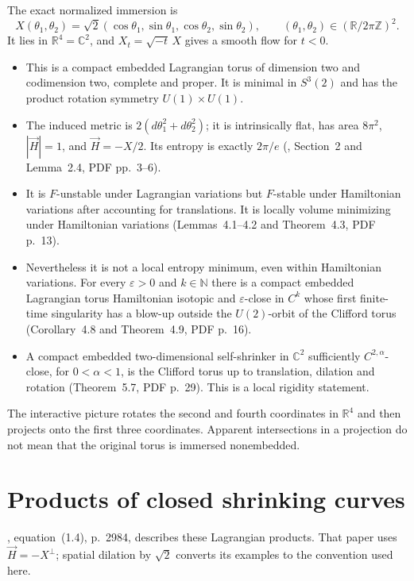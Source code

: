 \begin{example}\label{ex:catalogue-clifford-torus}
The exact normalized immersion is
\[
 X(\theta_1,\theta_2)=\sqrt2
 (\cos\theta_1,\sin\theta_1,\cos\theta_2,\sin\theta_2),
 \qquad (\theta_1,\theta_2)\in(\mathbb R/2\pi\mathbb Z)^2.
\]
It lies in $\mathbb R^4=\mathbb C^2$, and
$X_t=\sqrt{-t}\,X$ gives a smooth flow for $t<0$.
\begin{itemize}
\item This is a compact embedded Lagrangian torus of dimension two and
codimension two, complete and proper. It is minimal in $S^3(2)$ and has
the product rotation symmetry $U(1)\times U(1)$.
\item The induced metric is $2(d\theta_1^2+d\theta_2^2)$; it is
intrinsically flat, has area $8\pi^2$, $|\vec H|=1$, and
$\vec H=-X/2$. Its entropy is exactly $2\pi/e$
(\cite{CatELS2020}, Section~2 and Lemma~2.4, PDF pp.~3--6).
\item It is $F$-unstable under Lagrangian variations but $F$-stable under
Hamiltonian variations after accounting for translations. It is locally
volume minimizing under Hamiltonian variations (Lemmas~4.1--4.2 and
Theorem~4.3, PDF p.~13).
\item Nevertheless it is not a local entropy minimum, even within
Hamiltonian variations. For every $\varepsilon>0$ and $k\in\mathbb N$
there is a compact embedded Lagrangian torus Hamiltonian isotopic and
$\varepsilon$-close in $C^k$ whose first finite-time singularity has a
blow-up outside the $U(2)$-orbit of the Clifford torus
(Corollary~4.8 and Theorem~4.9, PDF p.~16).
\item A compact embedded two-dimensional self-shrinker in $\mathbb C^2$
sufficiently $C^{2,\alpha}$-close, for $0<\alpha<1$, is the Clifford
torus up to translation, dilation and rotation (Theorem~5.7, PDF p.~29).
This is a local rigidity statement.
\end{itemize}
The interactive picture rotates the second and fourth coordinates in
$\mathbb R^4$ and then projects onto the first three coordinates. Apparent intersections in a
projection do not mean that the original torus is immersed nonembedded.
\end{example}

\chapter{Products of closed shrinking curves}\label{sec:catalogue-curve-products}
\cite{CatSmoczyk2005}, equation~(1.4), p.~2984, describes these
Lagrangian products. That paper uses $\vec H=-X^\perp$; spatial dilation
by $\sqrt2$ converts its examples to the convention used here.

